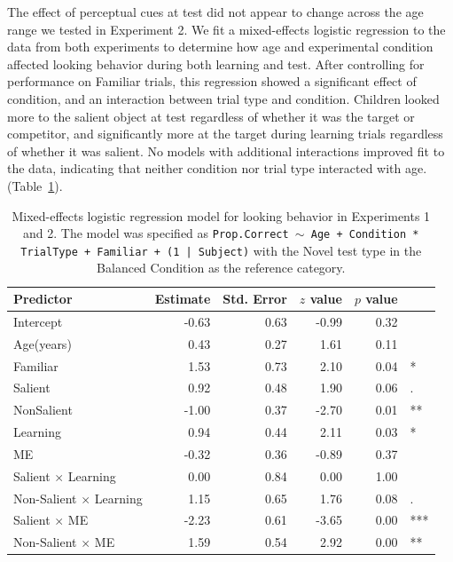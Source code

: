 \documentclass[man,floatsintext]{apa6}
\begin{document}
The effect of perceptual cues at test did not appear to change across the age range we tested in Experiment 2. We fit a mixed-effects logistic regression to the data from both experiments to determine how age and experimental condition affected looking behavior during both learning and test. After controlling for performance on Familiar trials, this regression showed a significant effect of condition, and an interaction between trial type and condition. Children looked more to the salient object at test regardless of whether it was the target or competitor, and significantly more at the target during learning trials regardless of whether it was salient. No models with additional interactions improved fit to the data, indicating that neither condition nor trial type interacted with age. (Table~\ref{tab:model_table}). 

\begin{table}[tb]
\centering
\begin{tabular}{lrrrrl}
 Predictor & Estimate & Std. Error & $z$ value & $p$ value &  \\ 
  \hline
Intercept & -0.63 & 0.63 & -0.99 & 0.32 &  \\ 
  Age(years) & 0.43 & 0.27 & 1.61 & 0.11 &  \\ 
  Familiar & 1.53 & 0.73 & 2.10 & 0.04 & * \\ 
  Salient & 0.92 & 0.48 & 1.90 & 0.06 & . \\ 
  NonSalient & -1.00 & 0.37 & -2.70 & 0.01 & ** \\ 
  Learning & 0.94 & 0.44 & 2.11 & 0.03 & * \\ 
  ME & -0.32 & 0.36 & -0.89 & 0.37 &  \\ 
  Salient $\times$ Learning & 0.00 & 0.84 & 0.00 & 1.00 &  \\ 
  Non-Salient $\times$ Learning & 1.15 & 0.65 & 1.76 & 0.08 & . \\ 
  Salient $\times$ ME & -2.23 & 0.61 & -3.65 & 0.00 & *** \\ 
  Non-Salient $\times$ ME & 1.59 & 0.54 & 2.92 & 0.00 & ** \\ 
   \hline
\end{tabular}
\vspace{6pt}
\caption{\label{tab:model_table} Mixed-effects logistic regression model for looking behavior in Experiments 1 and 2. The model was specified as \small{\tt{Prop.Correct $\sim$ Age + Condition * TrialType + Familiar + (1 | Subject)}} with the Novel test type in the Balanced Condition as the reference category.}
\end{table}
\end{document}

